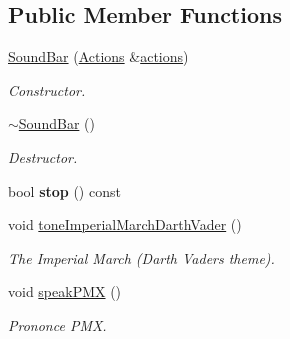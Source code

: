 \subsection*{Public Member Functions}
\begin{DoxyCompactItemize}
\item 
\mbox{\label{classSoundBar_acb269413c6c9d92d763c301ed3aed076}} 
\hyperlink{classSoundBar_acb269413c6c9d92d763c301ed3aed076}{Sound\+Bar} (\hyperlink{classActions}{Actions} \&\hyperlink{classAActionsElement_a3fbd5b8201049a59602d8b7201a9ef8a}{actions})
\begin{DoxyCompactList}\small\item\em Constructor. \end{DoxyCompactList}\item 
\mbox{\label{classSoundBar_aa5c9a9e653d307e23d40548c9c4bd011}} 
\hyperlink{classSoundBar_aa5c9a9e653d307e23d40548c9c4bd011}{$\sim$\+Sound\+Bar} ()
\begin{DoxyCompactList}\small\item\em Destructor. \end{DoxyCompactList}\item 
\mbox{\label{classSoundBar_ae0715c350a52892e8f29335c7237169a}} 
bool {\bfseries stop} () const
\item 
\mbox{\label{classSoundBar_ae664c0358a2940f86b009a5acd6e145d}} 
void \hyperlink{classSoundBar_ae664c0358a2940f86b009a5acd6e145d}{tone\+Imperial\+March\+Darth\+Vader} ()
\begin{DoxyCompactList}\small\item\em The Imperial March (Darth Vader\textquotesingle{}s theme). \end{DoxyCompactList}\item 
\mbox{\label{classSoundBar_a9877829561905b08957abcc7ddd22ac9}} 
void \hyperlink{classSoundBar_a9877829561905b08957abcc7ddd22ac9}{speak\+P\+MX} ()
\begin{DoxyCompactList}\small\item\em Prononce P\+MX. \end{DoxyCompactList}\item 
\mbox{\label{classSoundBar_a2e65477237a7d48295d638f5b478a72c}} 

\end{DoxyCompactItemize}
